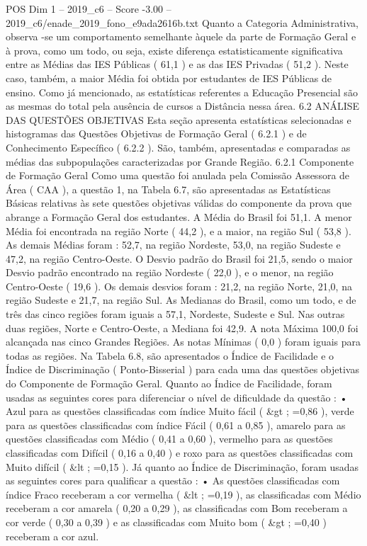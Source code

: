 \begin{textsample}{POS Dim 1 – 2019\_c6 – Score -3.00 – 2019\_c6/enade\_2019\_fono\_e9ada2616b.txt}
Quanto a Categoria Administrativa, observa -se um comportamento semelhante àquele da parte de Formação Geral e à prova, como um todo, ou seja, existe diferença estatisticamente significativa entre as Médias das IES Públicas ( 61,1 ) e as das IES Privadas ( 51,2 ).
Neste caso, também, a maior Média foi obtida por estudantes de IES Públicas de ensino.
Como já mencionado, as estatísticas referentes a Educação Presencial são as mesmas do total pela ausência de cursos a Distância nessa área. 6.2 ANÁLISE DAS QUESTÕES OBJETIVAS Esta seção apresenta estatísticas selecionadas e histogramas das Questões Objetivas de Formação Geral ( 6.2.1 ) e de Conhecimento Específico ( 6.2.2 ).
São, também, apresentadas e comparadas as médias das subpopulações caracterizadas por Grande Região. 6.2.1 Componente de Formação Geral Como uma questão foi anulada pela Comissão Assessora de Área ( CAA ), a questão 1, na Tabela 6.7, são apresentadas as Estatísticas Básicas relativas às sete questões objetivas válidas do componente da prova que abrange a Formação Geral dos estudantes.
A Média do Brasil foi 51,1.
A menor Média foi encontrada na região Norte ( 44,2 ), e a maior, na região Sul ( 53,8 ).
As demais Médias foram : 52,7, na região Nordeste, 53,0, na região Sudeste e 47,2, na região Centro-Oeste.
O Desvio padrão do Brasil foi 21,5, sendo o maior Desvio padrão encontrado na região Nordeste ( 22,0 ), e o menor, na região Centro-Oeste ( 19,6 ).
Os demais desvios foram : 21,2, na região Norte, 21,0, na região Sudeste e 21,7, na região Sul.
As Medianas do Brasil, como um todo, e de três das cinco regiões foram iguais a 57,1, Nordeste, Sudeste e Sul.
Nas outras duas regiões, Norte e Centro-Oeste, a Mediana foi 42,9.
A nota Máxima 100,0 foi alcançada nas cinco Grandes Regiões.
As notas Mínimas ( 0,0 ) foram iguais para todas as regiões.
Na Tabela 6.8, são apresentados o Índice de Facilidade e o Índice de Discriminação ( Ponto-Bisserial ) para cada uma das questões objetivas do Componente de Formação Geral.
Quanto ao Índice de Facilidade, foram usadas as seguintes cores para diferenciar o nível de dificuldade da questão : • Azul para as questões classificadas com índice Muito fácil ( \&gt ; =0,86 ), verde para as questões classificadas com índice Fácil ( 0,61 a 0,85 ), amarelo para as questões classificadas com Médio ( 0,41 a 0,60 ), vermelho para as questões classificadas com Difícil ( 0,16 a 0,40 ) e roxo para as questões classificadas com Muito difícil ( \&lt ; =0,15 ).
Já quanto ao Índice de Discriminação, foram usadas as seguintes cores para qualificar a questão : • As questões classificadas com índice Fraco receberam a cor vermelha ( \&lt ; =0,19 ), as classificadas com Médio receberam a cor amarela ( 0,20 a 0,29 ), as classificadas com Bom receberam a cor verde ( 0,30 a 0,39 ) e as classificadas com Muito bom ( \&gt ; =0,40 ) receberam a cor azul.

\end{textsample}
